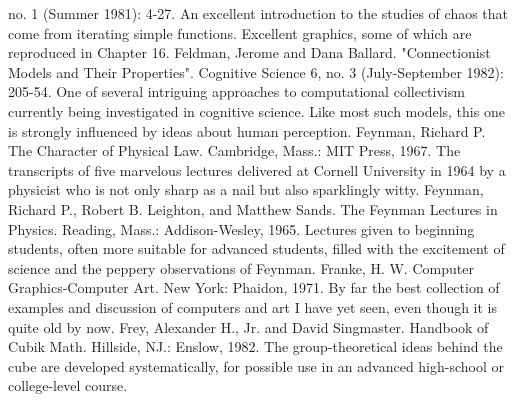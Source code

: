  no. 1 (Summer 1981): 4-27. An excellent introduction to the studies of chaos that come
  from iterating simple functions. Excellent graphics, some of which are reproduced in
  Chapter 16.
Feldman, Jerome and Dana Ballard. "Connectionist Models and Their Properties". Cognitive
  Science 6, no. 3 (July-September 1982): 205-54. One of several intriguing approaches to
  computational collectivism currently being investigated in cognitive science. Like most
  such models, this one is strongly influenced by ideas about human perception.
Feynman, Richard P. The Character of Physical Law. Cambridge, Mass.: MIT Press, 1967.
  The transcripts of five marvelous lectures delivered at Cornell University in 1964 by a
  physicist who is not only sharp as a nail but also sparklingly witty.
Feynman, Richard P., Robert B. Leighton, and Matthew Sands. The Feynman Lectures in
  Physics. Reading, Mass.: Addison-Wesley, 1965. Lectures given to beginning students,
  often more suitable for advanced students, filled with the excitement of science and the
  peppery observations of Feynman.
Franke, H. W. Computer Graphics-Computer Art. New York: Phaidon, 1971. By far the best
  collection of examples and discussion of computers and art I have yet seen, even though it
  is quite old by now.
Frey, Alexander H., Jr. and David Singmaster. Handbook of Cubik Math. Hillside, NJ.:
  Enslow, 1982. The group-theoretical ideas behind the cube are developed systematically,
  for possible use in an advanced high-school or college-level course.


